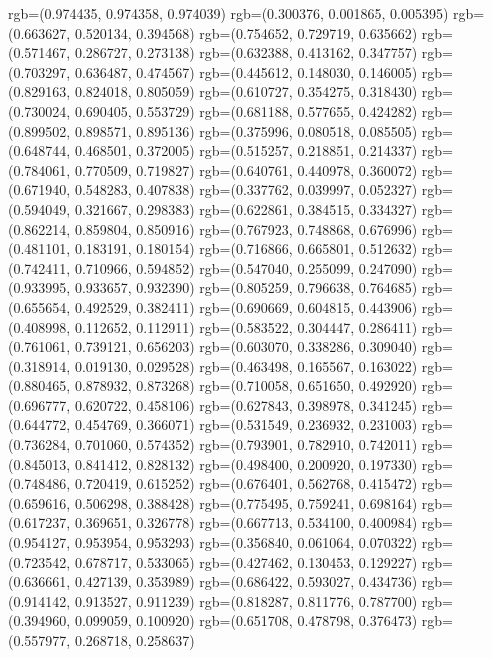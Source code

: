 {{{					rgb=(0.974435, 0.974358, 0.974039)
					rgb=(0.300376, 0.001865, 0.005395)
					rgb=(0.663627, 0.520134, 0.394568)
					rgb=(0.754652, 0.729719, 0.635662)
					rgb=(0.571467, 0.286727, 0.273138)
					rgb=(0.632388, 0.413162, 0.347757)
					rgb=(0.703297, 0.636487, 0.474567)
					rgb=(0.445612, 0.148030, 0.146005)
					rgb=(0.829163, 0.824018, 0.805059)
					rgb=(0.610727, 0.354275, 0.318430)
					rgb=(0.730024, 0.690405, 0.553729)
					rgb=(0.681188, 0.577655, 0.424282)
					rgb=(0.899502, 0.898571, 0.895136)
					rgb=(0.375996, 0.080518, 0.085505)
					rgb=(0.648744, 0.468501, 0.372005)
					rgb=(0.515257, 0.218851, 0.214337)
					rgb=(0.784061, 0.770509, 0.719827)
					rgb=(0.640761, 0.440978, 0.360072)
					rgb=(0.671940, 0.548283, 0.407838)
					rgb=(0.337762, 0.039997, 0.052327)
					rgb=(0.594049, 0.321667, 0.298383)
					rgb=(0.622861, 0.384515, 0.334327)
					rgb=(0.862214, 0.859804, 0.850916)
					rgb=(0.767923, 0.748868, 0.676996)
					rgb=(0.481101, 0.183191, 0.180154)
					rgb=(0.716866, 0.665801, 0.512632)
					rgb=(0.742411, 0.710966, 0.594852)
					rgb=(0.547040, 0.255099, 0.247090)
					rgb=(0.933995, 0.933657, 0.932390)
					rgb=(0.805259, 0.796638, 0.764685)
					rgb=(0.655654, 0.492529, 0.382411)
					rgb=(0.690669, 0.604815, 0.443906)
					rgb=(0.408998, 0.112652, 0.112911)
					rgb=(0.583522, 0.304447, 0.286411)
					rgb=(0.761061, 0.739121, 0.656203)
					rgb=(0.603070, 0.338286, 0.309040)
					rgb=(0.318914, 0.019130, 0.029528)
					rgb=(0.463498, 0.165567, 0.163022)
					rgb=(0.880465, 0.878932, 0.873268)
					rgb=(0.710058, 0.651650, 0.492920)
					rgb=(0.696777, 0.620722, 0.458106)
					rgb=(0.627843, 0.398978, 0.341245)
					rgb=(0.644772, 0.454769, 0.366071)
					rgb=(0.531549, 0.236932, 0.231003)
					rgb=(0.736284, 0.701060, 0.574352)
					rgb=(0.793901, 0.782910, 0.742011)
					rgb=(0.845013, 0.841412, 0.828132)
					rgb=(0.498400, 0.200920, 0.197330)
					rgb=(0.748486, 0.720419, 0.615252)
					rgb=(0.676401, 0.562768, 0.415472)
					rgb=(0.659616, 0.506298, 0.388428)
					rgb=(0.775495, 0.759241, 0.698164)
					rgb=(0.617237, 0.369651, 0.326778)
					rgb=(0.667713, 0.534100, 0.400984)
					rgb=(0.954127, 0.953954, 0.953293)
					rgb=(0.356840, 0.061064, 0.070322)
					rgb=(0.723542, 0.678717, 0.533065)
					rgb=(0.427462, 0.130453, 0.129227)
					rgb=(0.636661, 0.427139, 0.353989)
					rgb=(0.686422, 0.593027, 0.434736)
					rgb=(0.914142, 0.913527, 0.911239)
					rgb=(0.818287, 0.811776, 0.787700)
					rgb=(0.394960, 0.099059, 0.100920)
					rgb=(0.651708, 0.478798, 0.376473)
					rgb=(0.557977, 0.268718, 0.258637)
}}}
